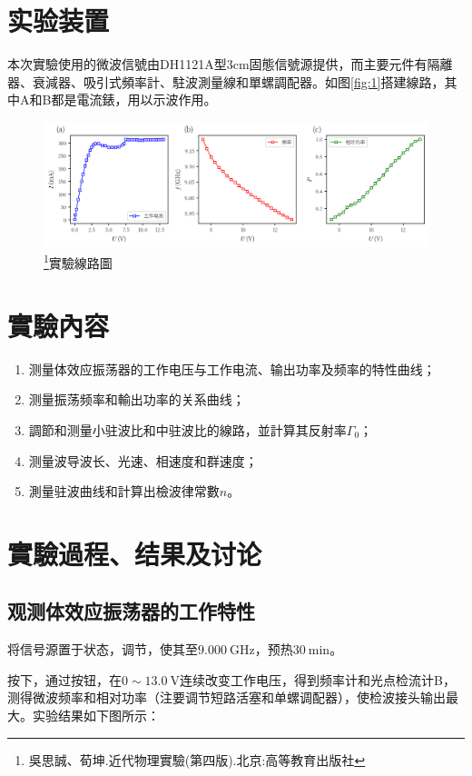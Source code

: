 \documentclass[font=fandol]{mpltx}
\begin{document}
\section{实验装置}
本次實驗使用的微波信號由DH1121A型3cm固態信號源提供，而主要元件有隔離器、衰減器、吸引式頻率計、駐波測量線和單螺調配器。如图\autoref{fig:1}搭建線路，其中A和B都是電流錶，用以示波作用。
\begin{figure}
	\centering
	\includegraphics[width=0.85\linewidth]{fig/1.png}
	\caption{\footnote{吳思誠、荀坤.近代物理實驗(第四版).北京:高等教育出版社}實驗線路圖}
	\label{fig:1}
\end{figure}

\section{實驗內容}
\begin{enumerate}
	\item 测量体效应振荡器的工作电压与工作电流、输出功率及频率的特性曲线；
	\item 测量振荡频率和輸出功率的关系曲线；
	\item 調節和测量小驻波比和中驻波比的線路，並計算其反射率$\Gamma_0$；
	\item 测量波导波长、光速、相速度和群速度；
	\item 測量驻波曲线和計算出檢波律常數$n$。
\end{enumerate}

\section{實驗過程、结果及讨论}
\subsection{观测体效应振荡器的工作特性}
将信号源置于状态，调节，使其至$\qty{9.000}{\GHz}$，预热$\qty{30}{\minute}$。
\par
按下，通过按钮，在$0\sim\qty{13.0}{\V}$连续改变工作电压，得到频率计和光点检流计B，测得微波频率和相对功率（注要调节短路活塞和单螺调配器），使检波接头输出最大。实验结果如下图所示：
\end{document}
